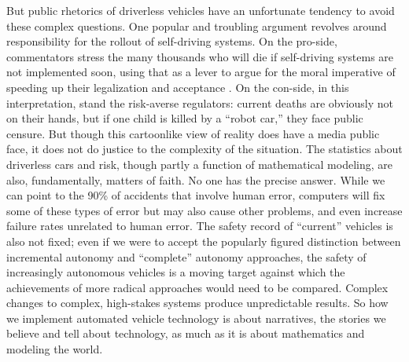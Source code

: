 
But public rhetorics of driverless vehicles have an unfortunate
tendency to avoid these complex questions. One popular and troubling
argument revolves around responsibility for the rollout of
self-driving systems. On the pro-side, commentators stress the many
thousands who will die if self-driving systems are not implemented
soon, using that as a lever to argue for the moral imperative of
speeding up their legalization and acceptance \cite{baileyReason}
\cite{howardRobots}. On the con-side, in 
this interpretation, stand the risk-averse regulators: current deaths
are obviously not on their hands, but if one child is killed by a
``robot car,'' they face public censure. But though this cartoonlike
view of reality does have a media public face, it does not do justice
to the complexity of the situation. The statistics about driverless
cars and risk, though partly a function of mathematical modeling, are
also, fundamentally, matters of faith. No one has the precise answer.
While we can point to the 90\% of accidents that involve human error,
computers will fix some of these types of error but may also cause
other problems, and even increase failure rates unrelated to human error.
The safety record of ``current'' vehicles is also not fixed; even if
we were to accept the popularly figured distinction between
incremental autonomy and ``complete'' autonomy approaches, the safety
of increasingly autonomous vehicles is a moving target against which
the achievements of more radical approaches would need to be compared.
Complex changes to complex, high-stakes systems produce unpredictable
results. So how we implement automated vehicle technology is
about narratives, the stories we believe and tell about technology, as
much as it is about mathematics and modeling the world. 

